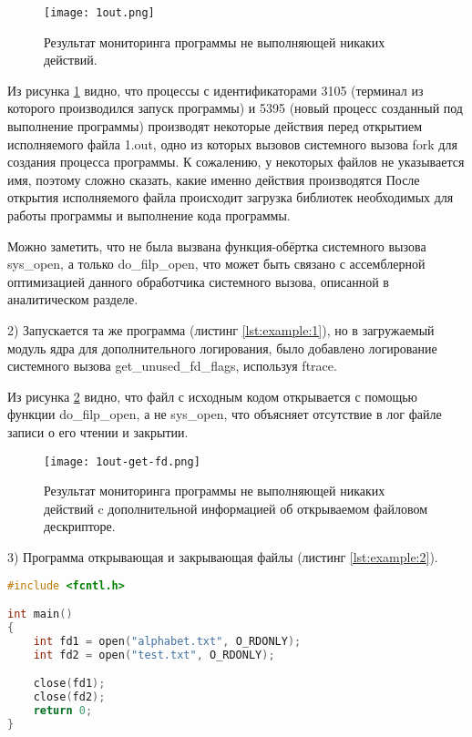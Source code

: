         \begin{figure}[h!]
            \centering
            \texttt{[image: 1out.png]}
            \caption{Результат мониторинга программы не выполняющей никаких действий.}
            \label{examples:1out}
        \end{figure}

        Из рисунка \ref{examples:1out} видно, что процессы с идентификаторами 3105 (терминал из которого производился запуск программы)
        и 5395 (новый процесс созданный под выполнение программы)
        производят некоторые действия перед открытием исполняемого файла 1.out,
        одно из которых вызовов системного вызова fork для создания процесса программы.
        К сожалению, у некоторых файлов не указывается имя,
        поэтому сложно сказать, какие именно действия производятся 
        После открытия исполняемого файла происходит загрузка библиотек
        необходимых для работы программы и выполнение кода программы.

        Можно заметить, что не была вызвана функция-обёртка системного вызова
        sys\_open, а только do\_filp\_open, что может быть связано с ассемблерной оптимизацией данного 
        обработчика системного вызова, описанной в аналитическом разделе.

    2) Запускается та же программа (листинг \ref{lst:example:1}),
        но в загружаемый модуль ядра для дополнительного 
        логирования, было добавлено 
        логирование системного вызова get\_unused\_fd\_flags, используя ftrace.

        Из рисунка \ref{examples:1out:alt} видно, что
        файл с исходным кодом 
        открывается с помощью функции do\_filp\_open, а не sys\_open,
        что объясняет отсутствие в лог файле записи о его чтении и закрытии.

        \begin{figure}[h!]
            \centering
            \texttt{[image: 1out-get-fd.png]}
            \caption{Результат мониторинга программы не выполняющей никаких действий c дополнительной информацией об открываемом файловом дескрипторе.}
            \label{examples:1out:alt}
        \end{figure}

    3) Программа открывающая и закрывающая файлы (листинг \ref{lst:example:2}).
        \begin{lstlisting}[language=C, label=lst:example:2, caption=Программа открывающая и закрывающая файлы]
#include <fcntl.h>

int main()
{
    int fd1 = open("alphabet.txt", O_RDONLY);
    int fd2 = open("test.txt", O_RDONLY);

    close(fd1);
    close(fd2);
    return 0;
}
        \end{lstlisting}
       
